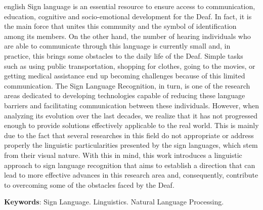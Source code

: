 \begin{resumo}[Abstract]
  \begin{otherlanguage*}{english}
    \noindent
    Sign language is an essential resource to ensure access to communication, education, cognitive and socio-emotional development for the Deaf. In fact, it is the main force that unites this community and the symbol of identification among its members.
    On the other hand, the number of hearing individuals who are able to communicate through this language is currently small and, in practice, this brings some obstacles to the daily life of the Deaf.
    Simple tasks such as using public transportation, shopping for clothes, going to the movies, or getting medical assistance end up becoming challenges because of this limited communication.
    The Sign Language Recognition, in turn, is one of the research areas dedicated to developing technologies capable of reducing these language barriers and facilitating communication between these individuals.
    However, when analyzing its evolution over the last decades, we realize that it has not progressed enough to provide solutions effectively applicable to the real world.
    This is mainly due to the fact that several researches in this field do not appropriate or address properly the linguistic particularities presented by the sign languages, which stem from their visual nature.
    With this in mind, this work introduces a linguistic approach to sign language recognition that aims to establish a direction that can lead to more effective advances in this research area and, consequently, contribute to overcoming some of the obstacles faced by the Deaf.

    \vspace{\onelineskip}

    \noindent
    \textbf{Keywords}: Sign Language. Linguistics. Natural Language Processing.
  \end{otherlanguage*}
\end{resumo}
